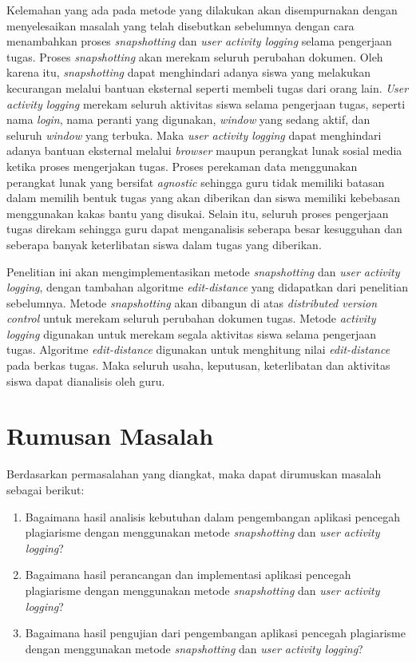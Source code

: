 Kelemahan yang ada pada metode yang dilakukan
\textcite{hellas2017plagiarism} akan disempurnakan dengan
menyelesaikan masalah yang telah disebutkan sebelumnya dengan cara
menambahkan proses \emph{snapshotting} dan \emph{user activity
  logging} selama pengerjaan tugas. Proses \emph{snapshotting} akan
merekam seluruh perubahan dokumen. Oleh karena
itu, \emph{snapshotting} dapat menghindari adanya siswa yang melakukan
kecurangan melalui bantuan eksternal seperti membeli tugas dari orang
lain. \emph{User activity logging} merekam seluruh aktivitas
siswa selama pengerjaan tugas, seperti nama \emph{login}, nama
peranti yang digunakan, \emph{window} yang sedang aktif, dan seluruh
\emph{window} yang terbuka. Maka \emph{user activity logging} dapat
menghindari adanya bantuan eksternal melalui \emph{browser} maupun perangkat
lunak sosial media ketika proses mengerjakan tugas.
Proses perekaman data menggunakan perangkat lunak yang bersifat
\emph{agnostic} sehingga guru tidak memiliki batasan dalam memilih
bentuk tugas yang akan diberikan dan siswa memiliki kebebasan
menggunakan kakas bantu yang disukai. Selain itu, seluruh proses
pengerjaan tugas direkam sehingga guru dapat menganalisis seberapa
besar kesugguhan dan seberapa banyak keterlibatan siswa dalam tugas
yang diberikan.

Penelitian ini akan mengimplementasikan metode \emph{snapshotting} dan
\emph{user activity logging}, dengan tambahan algoritme
\emph{edit-distance} yang didapatkan dari penelitian sebelumnya. Metode
\emph{snapshotting} akan dibangun di atas \emph{distributed version
control} untuk merekam seluruh perubahan dokumen tugas. Metode \emph{activity
logging} digunakan untuk merekam segala aktivitas siswa selama
pengerjaan tugas. Algoritme \emph{edit-distance} digunakan untuk menghitung nilai
\emph{edit-distance} pada berkas tugas. Maka seluruh usaha, keputusan, keterlibatan dan
aktivitas siswa dapat dianalisis oleh guru.

\section{Rumusan Masalah}

Berdasarkan permasalahan yang diangkat, maka dapat dirumuskan masalah
sebagai berikut:

\begin{enumerate}
\item Bagaimana hasil analisis kebutuhan dalam pengembangan aplikasi pencegah
  plagiarisme dengan menggunakan metode \emph{snapshotting} dan
  \emph{user activity logging}?
\item Bagaimana hasil perancangan dan implementasi aplikasi pencegah
  plagiarisme dengan menggunakan metode \emph{snapshotting} dan
  \emph{user activity logging}?
\item Bagaimana hasil pengujian dari pengembangan aplikasi pencegah
  plagiarisme dengan menggunakan metode \emph{snapshotting} dan
  \emph{user activity logging}?
\end{enumerate}

